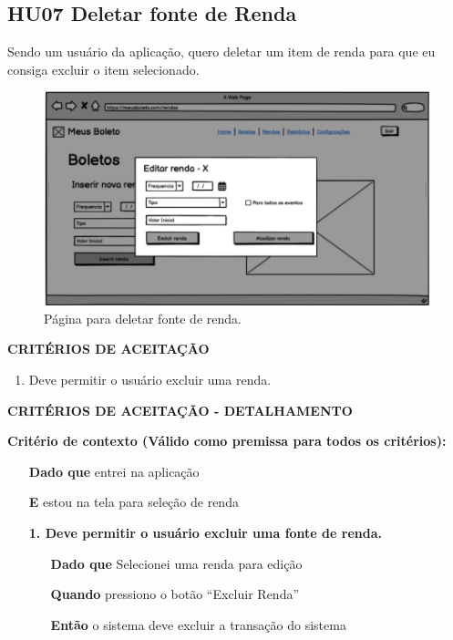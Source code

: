 \subsection{HU07 Deletar fonte de Renda}

Sendo um usuário da aplicação, quero deletar um item de renda para que eu consiga excluir o item selecionado.

\begin{figure}[htb]
	\caption{\label{fig:hu07}Página para deletar fonte de renda.}
	\begin{center}
		\includegraphics[scale=0.5]{images/EditarBoletoRenda.png}
	\end{center}
\end{figure}

\textbf{CRITÉRIOS DE ACEITAÇÃO}

\begin{enumerate}
    \item Deve permitir o usuário excluir uma renda.
    
\end{enumerate}

\textbf{CRITÉRIOS DE ACEITAÇÃO - DETALHAMENTO}

\textbf{Critério de contexto (Válido como premissa para todos os critérios):}

\begin{itemize}
    \item[\textbf{Dado que}] entrei na aplicação
    \item[\textbf{E}] estou na tela para seleção de renda
\end{itemize}


\begin{itemize}
    \item[] \textbf{1. Deve permitir o usuário excluir uma fonte de renda.}

    \begin{itemize}
        \item[\textbf{Dado que}] Selecionei uma renda para edição
        \item[\textbf{Quando}] pressiono o botão ``Excluir Renda''
        \item[\textbf{Então}] o sistema deve excluir a transação do sistema
    \end{itemize}
\end{itemize}


